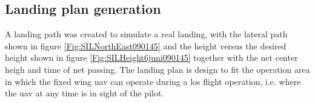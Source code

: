 \subsection{Landing plan generation}
A landing path was created to simulate a real landing, with the lateral path shown in figure \ref{Fig:SILNorthEast090145} and the height versus the desired height  shown in figure \ref{Fig:SILHeight6juni090145} together with the net center heigh and time of net passing. The landing plan is design to fit the operation area in which the fixed wing \gls{uav} can operate during a \gls{los} flight operation, i.e.  where the \gls{uav} at any time is in sight of the pilot.

